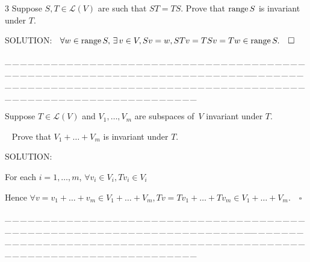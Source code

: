 \documentclass[a4paper, 11pt, UTF8]{article}
\def\range{\textup{range}\,}
\def\Lm{\mathcal{L}}
\begin{document}
\begin{large}
{\timesbf\Large 3} {\timessl\Large 
Suppose $S,T\in\Lm(V)$ are such that $ST=TS.$ Prove that $\range S$ is invariant under $T.$
}\par
{\timesbf S\footnotesize{OLUTION:}}\,\,\,
$\forall w\in\range S,\,\exists\,v\in V,Sv=w, STv=TSv=Tw\in\range S.\quad\square$\par
{\tiny \_\,\_\,\_\,\_\,\_\,\_\,\_\,\_\,\_\,\_\,\_\,\_\,\_\,\_\,\_\,\_\,\_\,\_\,\_\,\_\,\_\,\_\,\_\,\_\,\_\,\_\,\_\,\_\,\_\,\_\,\_\,\_\,\_\,\_\,\_\,\_\,\_\,\_\,\_\,\_\,\_\,\_\,\_\,\_\,\_\,\_\,\_\,\_\,\_\,\_\,\_\,\_\,\_\,\_\,\_\,\_\,\_\,\_\,\_\,\_\,\_\,\_\,\_\,\_\,\_\,\_\,\_\,\_\,\_\,\_\,\_\_\,\_\,\_\,\_\,\_\,\_\,\_\,\_\,\_\,\_\,\_\,\_\,\_\,\_\,\_\,\_\,\_\,\_\,\_\,\_\,\_\,\_\,\_\,\_\,\_\,\_\,\_\,\_\,\_\,\_\,\_\,\_\,\_\,\_\,\_\,\_\,\_\,\_\,\_\,\_\,\_\,\_\,\_\,\_\,\_\,\_\,\_\,\_\,\_\,\_\,\_\,\_\,\_\,\_\,\_\,\_\,\_\,\_\,\_\,\_\,\_\,\_\,\_\,\_\,\_\,\_\,\_\,\_\,\_\,\_\,\_}\par

{\Large{}} {\timessl\Large 
Suppose $T\in\Lm(V)$ and $V_1,\dots,V_m$ are subspaces of \,$V$ invariant under $T$.}\par\,\,\,
{\timessl\Large Prove that $V_1+\dots+V_m$ is invariant under $T$.
}\par
{\timesbf S\footnotesize{OLUTION:}}\par\quad
For each $i=1,\dots,m$, $\forall v_i\in V_i,Tv_i\in V_i$\par\quad
Hence $\forall v=v_1+\dots+v_m\in V_1+\dots+V_m,Tv=Tv_1+\dots+Tv_m\in V_1+\dots+V_m.\quad\square$\par
{\tiny \_\,\_\,\_\,\_\,\_\,\_\,\_\,\_\,\_\,\_\,\_\,\_\,\_\,\_\,\_\,\_\,\_\,\_\,\_\,\_\,\_\,\_\,\_\,\_\,\_\,\_\,\_\,\_\,\_\,\_\,\_\,\_\,\_\,\_\,\_\,\_\,\_\,\_\,\_\,\_\,\_\,\_\,\_\,\_\,\_\,\_\,\_\,\_\,\_\,\_\,\_\,\_\,\_\,\_\,\_\,\_\,\_\,\_\,\_\,\_\,\_\,\_\,\_\,\_\,\_\,\_\,\_\,\_\,\_\,\_\,\_\_\,\_\,\_\,\_\,\_\,\_\,\_\,\_\,\_\,\_\,\_\,\_\,\_\,\_\,\_\,\_\,\_\,\_\,\_\,\_\,\_\,\_\,\_\,\_\,\_\,\_\,\_\,\_\,\_\,\_\,\_\,\_\,\_\,\_\,\_\,\_\,\_\,\_\,\_\,\_\,\_\,\_\,\_\,\_\,\_\,\_\,\_\,\_\,\_\,\_\,\_\,\_\,\_\,\_\,\_\,\_\,\_\,\_\,\_\,\_\,\_\,\_\,\_\,\_\,\_\,\_\,\_\,\_\,\_\,\_\,\_}\par


\end{large}
\end{document}
